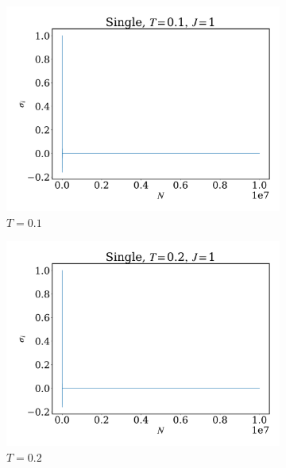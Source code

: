 \documentclass[12pt]{article}
\begin{document}
\begin{figure}
	\centering
	\begin{subfigure}[b]{0.49\textwidth}
		\centering
		\includegraphics[width=\textwidth]{fig1DJ1N1e7/sig_s_T0.1J1.pdf}
		\caption{$T=0.1$}
	\end{subfigure}
	\hfill
	\begin{subfigure}[b]{0.49\textwidth}
		\centering
		\includegraphics[width=\textwidth]{fig1DJ1N1e7/sig_s_T0.2J1.pdf}
		\caption{$T=0.2$}
	\end{subfigure}
	\hfill
	\begin{subfigure}[b]{0.49\textwidth}
		\centering

\end{subfigure}
\end{figure}
\end{document}
